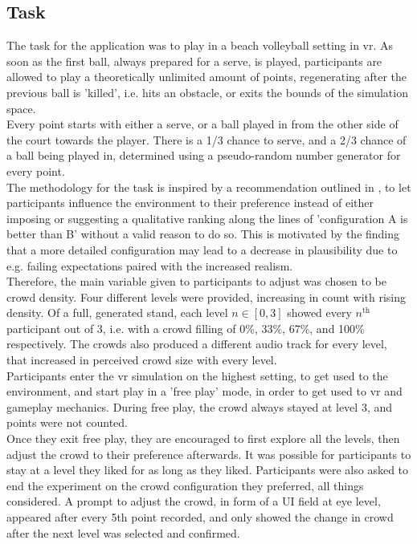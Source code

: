 \subsection{Task}
\label{subsec::methodology-task}

The task for the application was to play in a beach volleyball setting in \gls{vr}. As soon as the first ball, always prepared for a serve, is played, participants are allowed to play a theoretically unlimited amount of points, regenerating after the previous ball is 'killed', i.e. hits an obstacle, or exits the bounds of the simulation space.\\
Every point starts with either a serve, or a ball played in from the other side of the court towards the player. There is a 1/3 chance to serve, and a 2/3 chance of a ball being played in, determined using a pseudo-random number generator for every point.\\

The methodology for the task is inspired by a recommendation outlined in \cite{murcia-2020-evaluating}, to let participants influence the environment to their preference instead of either imposing or suggesting a qualitative ranking along the lines of 'configuration A is better than B' without a valid reason to do so. This is motivated by the finding that a more detailed configuration may lead to a decrease in plausibility due to e.g. failing expectations paired with the increased realism.\\
Therefore, the main variable given to participants to adjust was chosen to be crowd density. Four different levels were provided, increasing in count with rising density. Of a full, generated stand, each level $n\in[0, 3]$ showed every $n^{\text{th}}$ participant out of 3, i.e. with a crowd filling of 0\%, 33\%, 67\%, and 100\% respectively. The crowds also produced a different audio track for every level, that increased in perceived crowd size with every level.\\

Participants enter the \gls{vr} simulation on the highest setting, to get used to the environment, and start play in a 'free play' mode, in order to get used to \gls{vr} and gameplay mechanics. During free play, the crowd always stayed at level 3, and points were not counted.\\
Once they exit free play, they are encouraged to first explore all the levels, then adjust the crowd to their preference afterwards. It was possible for participants to stay at a level they liked for as long as they liked. Participants were also asked to end the experiment on the crowd configuration they preferred, all things considered. A prompt to adjust the crowd, in form of a UI field at eye level, appeared after every 5th point recorded, and only showed the change in crowd after the next level was selected and confirmed.\\

